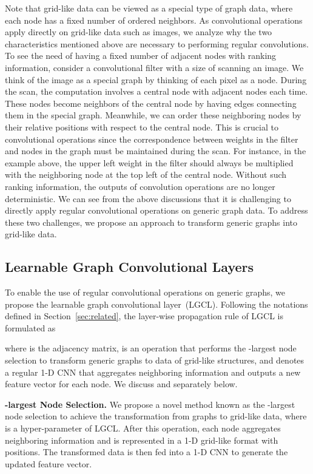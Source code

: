 \documentclass[sigconf]{acmart}
\begin{document}
Note that grid-like data can be viewed as a special type of graph
data, where each node has a fixed number of ordered neighbors. As
convolutional operations apply directly on grid-like data such as
images, we analyze why the two characteristics mentioned above are
necessary to performing regular convolutions. To see the need of
having a fixed number of adjacent nodes with ranking information,
consider a convolutional filter with a size of  scanning
an image. We think of the image as a special graph by thinking of
each pixel as a node. During the scan, the computation involves a
central node with  adjacent nodes each time. These
 nodes become neighbors of the central node by having edges
connecting them in the special graph. Meanwhile, we can order these
neighboring nodes by their relative positions with respect to the
central node. This is crucial to convolutional operations since the
correspondence between weights in the filter and nodes in the graph
must be maintained during the scan. For instance, in the example
above, the upper left weight in the  filter should
always be multiplied with the neighboring node at the top left of
the central node. Without such ranking information, the outputs of
convolution operations are no longer deterministic. We can see from
the above discussions that it is challenging to directly apply
regular convolutional operations on generic graph data. To address
these two challenges, we propose an approach to transform generic
graphs into grid-like data.


\subsection{Learnable Graph Convolutional Layers}

To enable the use of regular convolutional operations on generic
graphs, we propose the learnable graph convolutional layer~(LGCL).
Following the notations defined in Section~\ref{sec:related}, the
layer-wise propagation rule of LGCL is formulated as

where  is the adjacency matrix,  is an operation that
performs the -largest node selection to transform generic graphs
to data of grid-like structures, and  denotes a regular
1-D CNN that aggregates neighboring information and outputs a new
feature vector for each node. We discuss  and 
separately below.


\textbf{-largest Node Selection.} We propose a novel method known
as the -largest node selection to achieve the transformation from
graphs to grid-like data, where  is a hyper-parameter of LGCL.
After this operation, each node aggregates neighboring information
and is represented in a 1-D grid-like format with  positions.
The transformed data is then fed into a 1-D CNN to generate the
updated feature vector.
\end{document}

